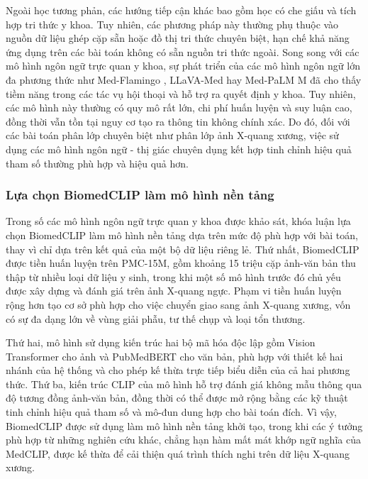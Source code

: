 Ngoài học tương phản, các hướng tiếp cận khác bao gồm học có che giấu và tích hợp tri thức y khoa. Tuy nhiên, các phương pháp này thường phụ thuộc vào nguồn dữ liệu ghép cặp sẵn hoặc đồ thị tri thức chuyên biệt, hạn chế khả năng ứng dụng trên các bài toán không có sẵn nguồn tri thức ngoài. Song song với các mô hình ngôn ngữ trực quan y khoa, sự phát triển của các mô hình ngôn ngữ lớn đa phương thức như Med-Flamingo \cite{moor_2023_medflamingo}, LLaVA-Med \cite{li_2023_llavamed} hay Med-PaLM M \cite{MED-PALM-M} đã cho thấy tiềm năng trong các tác vụ hội thoại và hỗ trợ ra quyết định y khoa. Tuy nhiên, các mô hình này thường có quy mô rất lớn, chi phí huấn luyện và suy luận cao, đồng thời vẫn tồn tại nguy cơ tạo ra thông tin không chính xác. Do đó, đối với các bài toán phân lớp chuyên biệt như phân lớp ảnh X-quang xương, việc sử dụng các mô hình ngôn ngữ - thị giác chuyên dụng kết hợp tinh chỉnh hiệu quả tham số thường phù hợp và hiệu quả hơn.

\subsubsection{Lựa chọn BiomedCLIP làm mô hình nền tảng}
\label{subsubsec:BiomedCLIP_selection}
Trong số các mô hình ngôn ngữ trực quan y khoa được khảo sát, khóa luận lựa chọn BiomedCLIP \cite{BiomedCLIP} làm mô hình nền tảng dựa trên mức độ phù hợp với bài toán, thay vì chỉ dựa trên kết quả của một bộ dữ liệu riêng lẻ. Thứ nhất, BiomedCLIP được tiền huấn luyện trên PMC-15M, gồm khoảng 15 triệu cặp ảnh-văn bản thu thập từ nhiều loại dữ liệu y sinh, trong khi một số mô hình trước đó chủ yếu được xây dựng và đánh giá trên ảnh X-quang ngực. Phạm vi tiền huấn luyện rộng hơn tạo cơ sở phù hợp cho việc chuyển giao sang ảnh X-quang xương, vốn có sự đa dạng lớn về vùng giải phẫu, tư thế chụp và loại tổn thương.

Thứ hai, mô hình sử dụng kiến trúc hai bộ mã hóa độc lập gồm Vision Transformer cho ảnh và PubMedBERT cho văn bản, phù hợp với thiết kế hai nhánh của hệ thống và cho phép kế thừa trực tiếp biểu diễn của cả hai phương thức. Thứ ba, kiến trúc CLIP của mô hình hỗ trợ đánh giá không mẫu thông qua độ tương đồng ảnh-văn bản, đồng thời có thể được mở rộng bằng các kỹ thuật tinh chỉnh hiệu quả tham số và mô-đun dung hợp cho bài toán đích. Vì vậy, BiomedCLIP được sử dụng làm mô hình nền tảng khởi tạo, trong khi các ý tưởng phù hợp từ những nghiên cứu khác, chẳng hạn hàm mất mát khớp ngữ nghĩa của MedCLIP, được kế thừa để cải thiện quá trình thích nghi trên dữ liệu X-quang xương.

